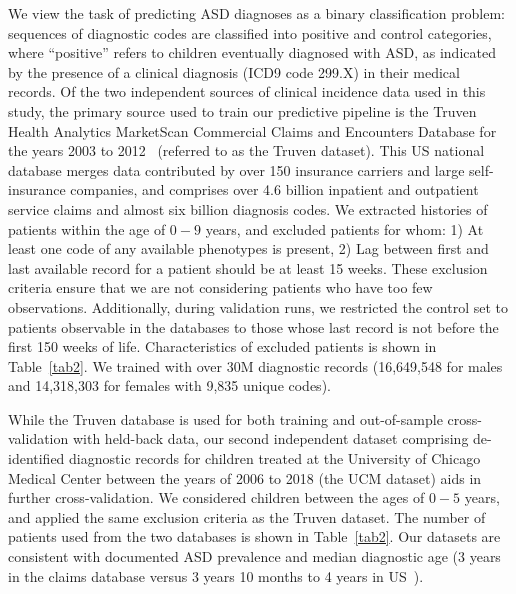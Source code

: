 \documentclass[3p,super,numbers,sort&compress,10pt]{elsarticle}
\begin{document}
We view the task of predicting  ASD diagnoses   as a binary classification problem: sequences of diagnostic codes are classified into positive and control categories, where ``positive'' refers to children eventually diagnosed with ASD, as indicated by the presence of a clinical diagnosis (ICD9 code 299.X) in their medical records. Of the two independent sources of clinical incidence data used in this study,  the primary source used to train our predictive pipeline  is the Truven Health Analytics MarketScan\textsuperscript{\textregistered} Commercial Claims and Encounters Database for the years 2003 to 2012~\cite{hansen2017truven} (referred to  as the Truven dataset). This US national database merges  data contributed by over 150 insurance carriers and large self-insurance companies,  and comprises over  4.6 billion inpatient and outpatient service claims and  almost six billion diagnosis codes. We extracted histories of patients within the age of $0-9$ years, and excluded  patients for whom:  1) At least one code of any available phenotypes is present, 2) Lag between first and last available record for a patient should be at least 15 weeks. These exclusion criteria ensure that we are not considering patients who have too few observations. Additionally, during validation runs,  we restricted the control set to patients observable in the databases to those whose last record is not before the first 150 weeks of life. Characteristics of excluded patients is shown in Table~\ref{tab2}. We trained with over  30M diagnostic records (16,649,548 for males and  14,318,303  for females with 9,835 unique  codes).

While the Truven database is used for both training and out-of-sample cross-validation with held-back  data, our second independent dataset  comprising de-identified diagnostic records for children treated at the University of Chicago Medical Center between the years of 2006 to 2018 (the UCM dataset) aids in further cross-validation. We considered children between the ages of $0-5$ years, and  applied the same exclusion criteria as the Truven dataset.  The  number of  patients used from the two databases is shown in Table~\ref{tab2}. Our datasets are consistent with documented ASD prevalence and median diagnostic age (3 years in the claims database  versus 3 years 10 months to 4 years  in US~\cite{pmid29701730}). %
\end{document}
